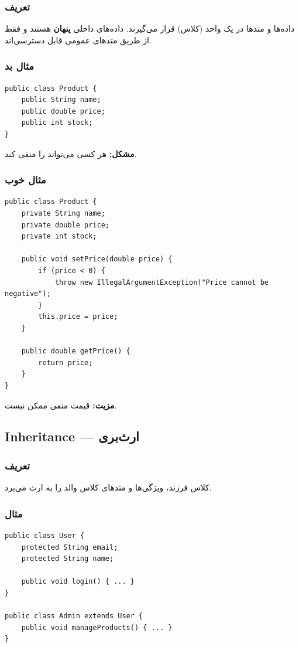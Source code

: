 \documentclass[12pt, a4paper]{article}
\begin{document}
\subsubsection{تعریف}
داده‌ها و متدها در یک واحد (کلاس) قرار می‌گیرند. داده‌های داخلی 
\textbf{پنهان} هستند و فقط از طریق متدهای عمومی قابل دسترسی‌اند.

\subsubsection{مثال بد}
\begin{lstlisting}
public class Product {
    public String name;
    public double price;
    public int stock;
}
\end{lstlisting}

\textbf{مشکل:} هر کسی می‌تواند  را منفی کند.

\subsubsection{مثال خوب}
\begin{lstlisting}
public class Product {
    private String name;
    private double price;
    private int stock;
    
    public void setPrice(double price) {
        if (price < 0) {
            throw new IllegalArgumentException("Price cannot be 
negative");
        }
        this.price = price;
    }
    
    public double getPrice() {
        return price;
    }
}
\end{lstlisting}

\textbf{مزیت:} قیمت منفی ممکن نیست.

\subsection{Inheritance — ارث‌بری}

\subsubsection{تعریف}
کلاس فرزند، ویژگی‌ها و متدهای کلاس والد را به ارث می‌برد.

\subsubsection{مثال}
\begin{lstlisting}
public class User {
    protected String email;
    protected String name;
    
    public void login() { ... }
}

public class Admin extends User {
    public void manageProducts() { ... }
}
\end{lstlisting}
\end{document}
